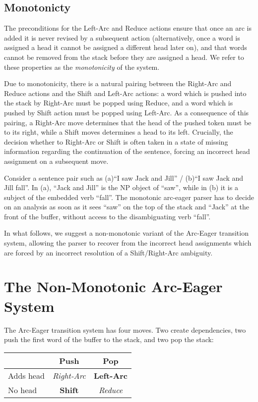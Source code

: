 \documentclass[11pt,letterpaper]{article}
\begin{document}
\subsection{Monotonicty}

The preconditions for the Left-Arc and Reduce actions ensure that once an
arc is added it is never revised by a subsequent action (alternatively,
once a word is assigned a head it cannot be assigned a different head
later on), and that words cannot be removed from the stack before they
are assigned a head. We refer to these properties as the
\textit{monotonicity} of the system.

Due to monotonicity, there is a natural pairing between the Right-Arc and
Reduce actions and the Shift and Left-Arc actions: a word which is pushed
into the stack by Right-Arc must be popped using Reduce,
 and a word which is pushed by Shift action must be popped
using Left-Arc.
As a consequence of this pairing, a Right-Arc move determines that the head of
the pushed token must be to its right, while a Shift moves determines a head
to its left. Crucially, the decision whether to Right-Arc or Shift is often taken
in a state of missing information regarding the continuation of the sentence,
forcing an incorrect head assignment on a subsequent move. 

Consider a sentence pair such as (a)``I saw Jack and Jill'' / (b)``I saw Jack and Jill
fall''. In (a), ``Jack and Jill'' is the NP object of ``saw'', while
in (b) it is a subject of the embedded verb ``fall''.  The monotonic arc-eager
parser has to decide on an analysis as soon as it sees ``saw'' on the top of the
stack and ``Jack'' at the front of the buffer, without access to the
disambiguating verb ``fall''.  

In what follows, we suggest a non-monotonic variant of the Arc-Eager transition
system, allowing the parser to recover from the incorrect head assignments
which are forced by an incorrect resolution of a Shift/Right-Arc ambiguity.

\section{The Non-Monotonic Arc-Eager System}

The Arc-Eager transition system \citep{nivre:04} has four moves. Two create 
dependencies, two push the first word of the buffer to the stack, and two pop 
the stack:

\begin{center}
    \begin{tabular}{l|cc}
             & Push  & Pop    \\
           \hline
           Adds head   & \emph{Right-Arc} & \textbf{Left-Arc}    \\
            No head    & \textbf{Shift} & \emph{Reduce}   \\
     \end{tabular}
\end{center}
\end{document}
